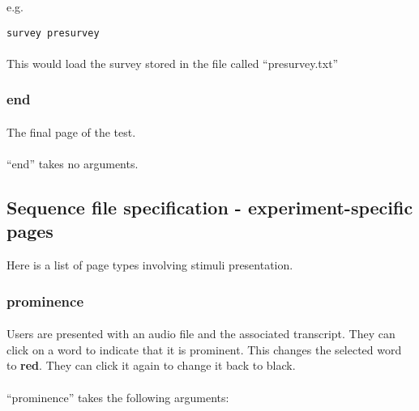e.g.

\begin{lstlisting}
survey presurvey
\end{lstlisting}

\paragraph{}
This would load the survey stored in the file called ``presurvey.txt''

\subsubsection{end}

\paragraph{}
The final page of the test.  

\paragraph{}
``end'' takes no arguments.

\subsection{Sequence file specification - experiment-specific pages}
\label{sec:sequenceSpecSpecific}

Here is a list of page types involving stimuli presentation.  

\subsubsection{prominence}

\paragraph{}
Users are presented with an audio file and the associated transcript.  They can click on a word to indicate that it is prominent.  This changes the selected word to \textbf{red}.  They can click it again to change it back to black.

\paragraph{}
``prominence'' takes the following arguments:

